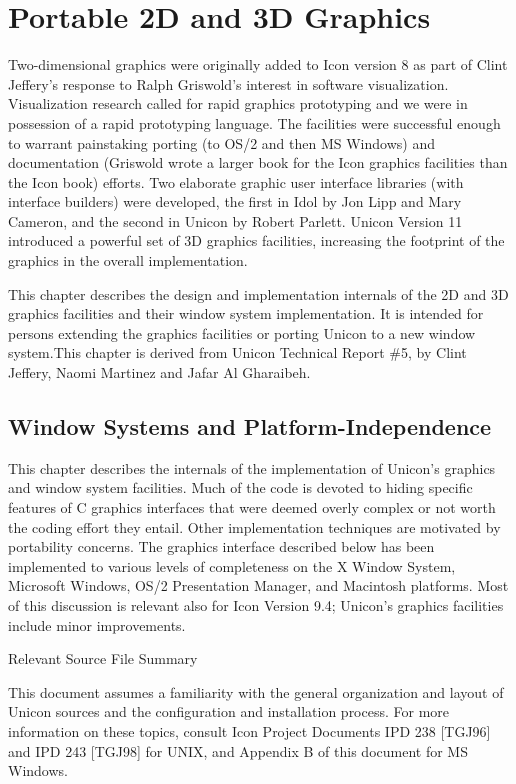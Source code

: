 \chapter{Portable 2D and 3D Graphics}

Two-dimensional graphics were originally added to Icon version 8 as
part of Clint Jeffery's response to Ralph Griswold's interest in
software visualization. Visualization research called for rapid
graphics prototyping and we were in possession of a rapid prototyping
language. The facilities were successful enough to warrant painstaking
porting (to OS/2 and then MS Windows) and documentation (Griswold wrote
a larger book for the Icon graphics facilities than the Icon book) efforts.
Two elaborate graphic user interface libraries (with interface
builders) were developed, the first in Idol by Jon Lipp and Mary
Cameron, and the second in Unicon by Robert Parlett.
Unicon Version 11 introduced a powerful set of 3D graphics facilities,
increasing the footprint of the graphics in the overall implementation.

This chapter describes the design and implementation internals of the
2D and 3D graphics facilities and their window system
implementation. It is intended for persons extending the graphics
facilities or porting Unicon to a new window system.This chapter is
derived from Unicon Technical Report \#5, by Clint Jeffery, Naomi
Martinez and Jafar Al Gharaibeh.


\section{Window Systems and Platform-Independence}

This chapter describes the internals of the implementation of Unicon's
graphics and window system facilities. Much of the code is devoted to
hiding specific features of C graphics interfaces that were deemed
overly complex or not worth the coding effort they entail. Other
implementation techniques are motivated by portability concerns. The
graphics interface described below has been implemented to various
levels of completeness on the X Window System, Microsoft Windows, OS/2
Presentation Manager, and Macintosh platforms. Most of this discussion
is relevant also for Icon Version 9.4; Unicon's graphics facilities
include minor improvements.

{\sffamily
Relevant Source File Summary}

This document assumes a familiarity with the general organization and
layout of Unicon sources and the configuration and installation
process. For more information on these topics, consult Icon Project
Documents IPD 238 [TGJ96] and IPD 243 [TGJ98] for UNIX, and Appendix B
of this document for MS Windows.

